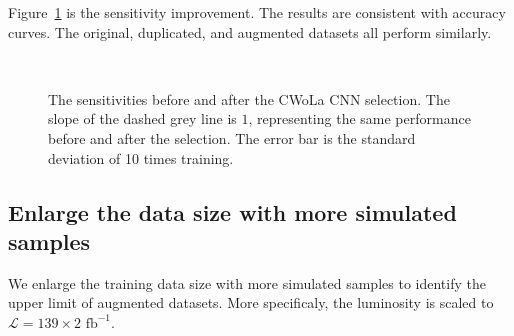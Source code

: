 \documentclass[12pt]{article}
\begin{document}
        Figure~\ref{fig:sensitivity_improvement_new_workflow} is the sensitivity improvement. The results are consistent with accuracy curves. The original, duplicated, and augmented datasets all perform similarly.
        \begin{figure}[htpb]
            \centering
             \\
            \caption{The sensitivities before and after the CWoLa CNN selection. The slope of the dashed grey line is $1$, representing the same performance before and after the selection. The error bar is the standard deviation of 10 times training.}
            \label{fig:sensitivity_improvement_new_workflow}
        \end{figure}
    \subsection{Enlarge the data size with more simulated samples}%
    \label{sub:enlarge_the_data_size_with_more_simulated_samples}
        We enlarge the training data size with more simulated samples to identify the upper limit of augmented datasets. More specificaly, the luminosity is scaled to $\mathcal{L} = 139 \times 2 \text{ fb}^{-1}$.
\end{document}
